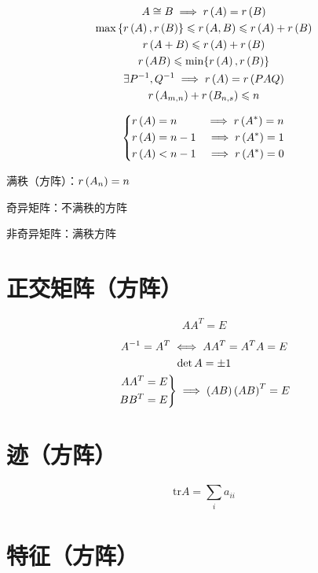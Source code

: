 \documentclass{article}
\begin{document}
\[\begin{gathered}
        A\cong B\implies r\left(A\right)=r\left(B\right)\\
        \max\left\{r\left(A\right),r\left(B\right)\right\}\leqslant r\left(A,B\right)\leqslant r\left(A\right)+r\left(B\right)\\
        r\left(A+B\right)\leqslant r\left(A\right)+r\left(B\right)\\
        r\left(AB\right)\leqslant\min\{r\left(A\right),r\left(B\right)\}\\
        \exists P^{-1},Q^{-1}\implies r\left(A\right)=r\left(PAQ\right)\\
        r\left(A_{m,n}\right)+r\left(B_{n,s}\right)\leqslant n
    \end{gathered}\]

\[\left\{\begin{aligned}
        r\left(A\right) & =n   & \implies r\left(A^*\right)=n \\
        r\left(A\right) & =n-1 & \implies r\left(A^*\right)=1 \\
        r\left(A\right) & <n-1 & \implies r\left(A^*\right)=0
    \end{aligned}\right.\]

满秩（方阵）：$r\left(A_n\right)=n$

奇异矩阵：不满秩的方阵

非奇异矩阵：满秩方阵

\section{正交矩阵（方阵）}

\begin{definition}
    \[AA^T=E\]
\end{definition}

\[\begin{gathered}
        A^{-1}=A^T\iff AA^T=A^TA=E\\
        \det A=\pm 1\\
        \left.\begin{aligned}
            AA^T & =E \\
            BB^T & =E
        \end{aligned}\right\}\implies\left(AB\right)\left(AB\right)^T=E
    \end{gathered}\]

\section{迹（方阵）}

\[\mathrm{tr}A=\sum_i a_{ii}\]

\section{特征（方阵）}
\end{document}
